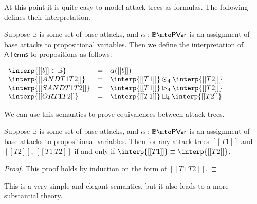 At this point it is quite easy to model attack trees as formulas.  The
following defines their interpretation.
\begin{definition}
  \label{def:interp-aterms-ternary}
  Suppose $\mathbb{B}$ is some set of base attacks, and $\alpha :
  \mathbb{B} \mto \mathsf{PVar}$ is an assignment of base attacks to
  propositional variables.  Then we define the interpretation of
  $\mathsf{ATerms}$ to propositions as follows:
  \begin{center}
    \begin{math}
      \begin{array}{lll}
        \interp{[[b]] \in \mathbb{B}} & = & \alpha([[b]])\\
        \interp{[[AND T1 T2]]} & = & \interp{[[T1]]} \odot_4 \interp{[[T2]]}\\
        \interp{[[SAND T1 T2]]} & = & \interp{[[T1]]} \rhd_4 \interp{[[T2]]}\\
        \interp{[[OR T1 T2]]} & = & \interp{[[T1]]} \sqcup_4 \interp{[[T2]]}\\
      \end{array}
    \end{math}
  \end{center}
\end{definition}
We can use this semantics to prove equivalences between attack trees.
\begin{lemma}
  \label{lemma:equivalence_of_attack_trees}
  Suppose $\mathbb{B}$ is some set of base attacks, and $\alpha :
  \mathbb{B} \mto \mathsf{PVar}$ is an assignment of base attacks to
  propositional variables.  Then for any attack trees $[[T1]]$ and
  $[[T2]]$, $[[T1 ~ T2]]$ if and only if $\interp{[[T1]]} \equiv \interp{[[T2]]}$.
\end{lemma}
\begin{proof}
  This proof holds by induction on the form of $[[T1 ~ T2]]$.
\end{proof}
This is a very simple and elegant semantics, but it also leads to a
more substantial theory.

